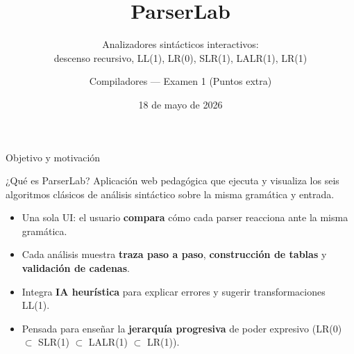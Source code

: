 \documentclass[aspectratio=169,10pt]{beamer}
\title{\textbf{ParserLab}}
\subtitle{Analizadores sintácticos interactivos: \\
descenso recursivo, LL(1), LR(0), SLR(1), LALR(1), LR(1)}
\author{Compiladores — Examen 1 (Puntos extra)}
\institute{UTEC · 2026-1}
\date{18 de mayo de 2026}
\begin{document}
\maketitle

\begin{frame}{Objetivo y motivación}
  \begin{block}{¿Qué es ParserLab?}
    Aplicación web pedagógica que ejecuta y \alert{visualiza} los
    seis algoritmos clásicos de análisis sintáctico sobre la misma
    gramática y entrada.
  \end{block}

  \begin{itemize}
    \item Una sola UI: el usuario \textbf{compara} cómo cada parser
      reacciona ante la misma gramática.
    \item Cada análisis muestra \textbf{traza paso a paso}, \textbf{construcción
      de tablas} y \textbf{validación de cadenas}.
    \item Integra \textbf{IA heurística} para explicar errores y sugerir
      transformaciones LL(1).
    \item Pensada para enseñar la \textbf{jerarquía progresiva} de poder
      expresivo (LR(0) $\subset$ SLR(1) $\subset$ LALR(1) $\subset$ LR(1)).
  \end{itemize}
\end{frame}
\end{document}
